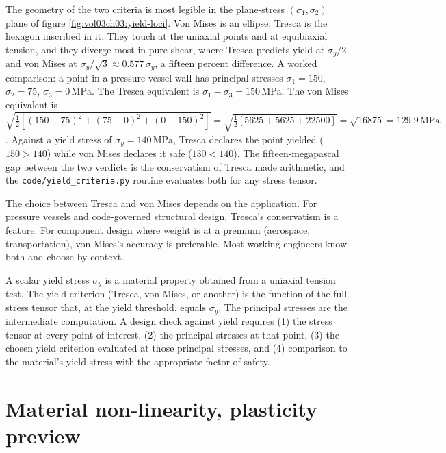 

The geometry of the two criteria is most legible in the plane-stress
$(\sigma_1, \sigma_2)$ plane of figure \ref{fig:vol03ch03:yield-loci}.
Von Mises is an ellipse; Tresca is the hexagon inscribed in it. They
touch at the uniaxial points and at equibiaxial tension, and they
diverge most in pure shear, where Tresca predicts yield at $\sigma_y/2$
and von Mises at $\sigma_y/\sqrt{3} \approx 0.577\,\sigma_y$, a fifteen
percent difference. A worked comparison: a point in a pressure-vessel
wall has principal stresses $\sigma_1 = 150$, $\sigma_2 = 75$,
$\sigma_3 = 0\,\text{MPa}$. The Tresca equivalent is $\sigma_1 -
\sigma_3 = 150\,\text{MPa}$. The von Mises equivalent is
$\sqrt{\tfrac{1}{2}[(150-75)^2 + (75-0)^2 + (0-150)^2]} =
\sqrt{\tfrac{1}{2}[5625 + 5625 + 22500]} = \sqrt{16875} = 129.9\,
\text{MPa}$. Against a yield stress of $\sigma_y = 140\,\text{MPa}$,
Tresca declares the point yielded ($150 > 140$) while von Mises declares
it safe ($130 < 140$). The fifteen-megapascal gap between the two
verdicts is the conservatism of Tresca made arithmetic, and the
\texttt{code/yield\_criteria.py} routine evaluates both for any stress
tensor.

The choice between Tresca and von Mises depends on the application.
For pressure vessels and code-governed structural design, Tresca's
conservatism is a feature. For component design where weight is at
a premium (aerospace, transportation), von Mises's accuracy is
preferable. Most working engineers know both and choose by context.

\begin{principle}
A scalar yield stress $\sigma_y$ is a material property obtained from
a uniaxial tension test. The yield criterion (Tresca, von Mises, or
another) is the function of the full stress tensor that, at the
yield threshold, equals $\sigma_y$. The principal stresses are the
intermediate computation. A design check against yield requires (1)
the stress tensor at every point of interest, (2) the principal
stresses at that point, (3) the chosen yield criterion evaluated at
those principal stresses, and (4) comparison to the material's
yield stress with the appropriate factor of safety.
\end{principle}

\section{Material non-linearity, plasticity preview}

